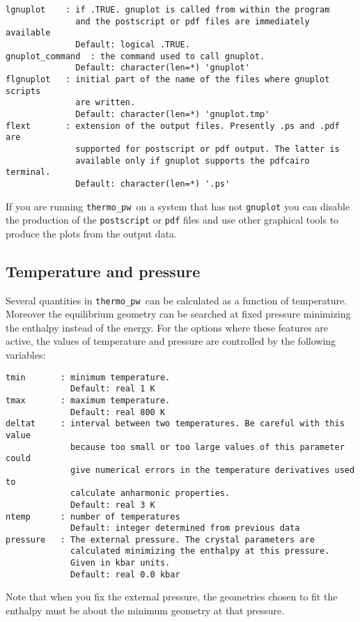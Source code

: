 \documentclass[12pt,a4paper]{article}
\def\thermo{\texttt{thermo\_pw}}
\begin{document}
\begin{verbatim}
lgnuplot    : if .TRUE. gnuplot is called from within the program
              and the postscript or pdf files are immediately available
              Default: logical .TRUE.
gnuplot_command  : the command used to call gnuplot.
              Default: character(len=*) 'gnuplot'
flgnuplot   : initial part of the name of the files where gnuplot scripts 
              are written.
              Default: character(len=*) 'gnuplot.tmp'
flext       : extension of the output files. Presently .ps and .pdf are
              supported for postscript or pdf output. The latter is
              available only if gnuplot supports the pdfcairo terminal.
              Default: character(len=*) '.ps'
\end{verbatim}
If you are running \thermo\ on a system that has not \texttt{gnuplot}
you can disable the production of the \texttt{postscript} or 
\texttt{pdf} files and use other
graphical tools to produce the plots from the output data. 

\subsection{\color{web-blue}Temperature and pressure}
Several quantities in \thermo\ can be calculated as a function of temperature.
Moreover the equilibrium geometry can be searched at fixed pressure 
minimizing the enthalpy instead of the energy.
For the options where these features are active, the values of temperature
and pressure are controlled by the following variables:
\begin{verbatim}
tmin       : minimum temperature.
             Default: real 1 K
tmax       : maximum temperature.
             Default: real 800 K
deltat     : interval between two temperatures. Be careful with this value
             because too small or too large values of this parameter could 
             give numerical errors in the temperature derivatives used to 
             calculate anharmonic properties.
             Default: real 3 K
ntemp      : number of temperatures
             Default: integer determined from previous data
pressure   : The external pressure. The crystal parameters are
             calculated minimizing the enthalpy at this pressure. 
             Given in kbar units. 
             Default: real 0.0 kbar
\end{verbatim}
Note that when you fix the external pressure, the geometries chosen to 
fit the enthalpy must be about the minimum geometry at that pressure.
\end{document}
